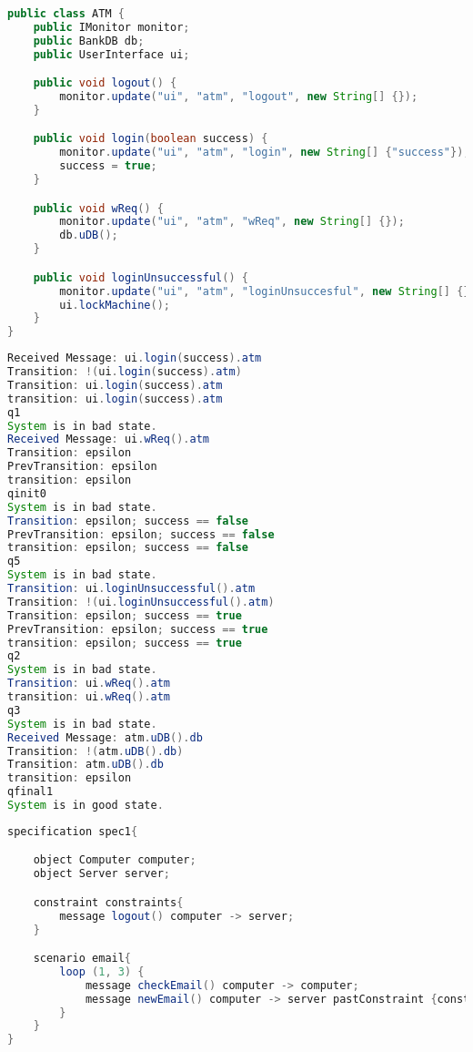 \begin{lstlisting}[language=java, frame=single, float=ht!, caption={7.1. scenariohoz tartozó rendszer ATM Java osztálya.},captionpos=b]
public class ATM {
	public IMonitor monitor;
	public BankDB db;
	public UserInterface ui;

	public void logout() {
		monitor.update("ui", "atm", "logout", new String[] {});
	}

	public void login(boolean success) {
		monitor.update("ui", "atm", "login", new String[] {"success"});
		success = true;
	}

	public void wReq() {
		monitor.update("ui", "atm", "wReq", new String[] {});
		db.uDB();
	}

	public void loginUnsuccessful() {
		monitor.update("ui", "atm", "loginUnsuccesful", new String[] {});
		ui.lockMachine();
	}
}
\end{lstlisting}

\begin{lstlisting}[language=java, frame=single, float=ht!, caption={7.1. scenario monitor kimenete.},captionpos=b]
Received Message: ui.login(success).atm
Transition: !(ui.login(success).atm)
Transition: ui.login(success).atm
transition: ui.login(success).atm
q1
System is in bad state.
Received Message: ui.wReq().atm
Transition: epsilon
PrevTransition: epsilon
transition: epsilon
qinit0
System is in bad state.
Transition: epsilon; success == false
PrevTransition: epsilon; success == false
transition: epsilon; success == false
q5
System is in bad state.
Transition: ui.loginUnsuccessful().atm
Transition: !(ui.loginUnsuccessful().atm)
Transition: epsilon; success == true
PrevTransition: epsilon; success == true
transition: epsilon; success == true
q2
System is in bad state.
Transition: ui.wReq().atm
transition: ui.wReq().atm
q3
System is in bad state.
Received Message: atm.uDB().db
Transition: !(atm.uDB().db)
Transition: atm.uDB().db
transition: epsilon
qfinal1
System is in good state.
\end{lstlisting}

\begin{lstlisting}[language=java, frame=single, float=ht!, caption={Loop operátort tartalmazó scenario.},captionpos=b]
specification spec1{

	object Computer computer;
	object Server server;

	constraint constraints{
		message logout() computer -> server;
	}

	scenario email{
		loop (1, 3) {
			message checkEmail() computer -> computer;
			message newEmail() computer -> server pastConstraint {constraints};
		}
	}
}
\end{lstlisting}

